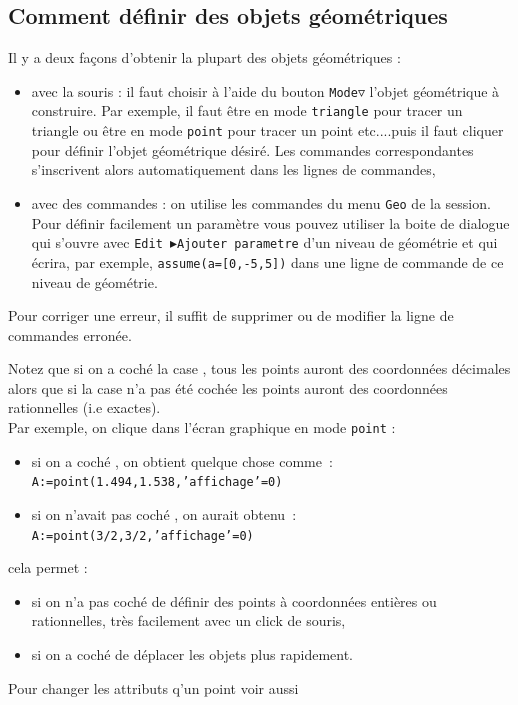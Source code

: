 \documentclass[a4paper,11pt]{article}
\begin{document}
\subsection{Comment d\'efinir des objets g\'eom\'etriques}\label{sec:sim}
Il y a deux fa\c{c}ons d'obtenir la plupart des objets g\'eom\'etriques :
\begin{itemize}
\item avec la souris : il faut choisir \`a l'aide du bouton 
{\tt Mode$\triangledown$} l'objet 
g\'eom\'etrique \`a construire. Par exemple, il faut  \^etre en mode 
{\tt triangle} pour tracer un triangle ou \^etre en mode {\tt point} pour 
tracer un point etc....puis il faut cliquer pour d\'efinir l'objet 
g\'eom\'etrique d\'esir\'e. Les commandes correspondantes s'inscrivent alors
automatiquement dans les lignes de commandes, 
\item avec des commandes : on utilise les commandes du menu {\tt Geo} de la 
session.\\
Pour d\'efinir facilement un param\`etre vous pouvez utiliser la boite de 
dialogue qui s'ouvre avec {\tt Edit $\blacktriangleright$Ajouter parametre}
d'un niveau de g\'eom\'etrie et qui \'ecrira, par exemple, 
{\tt assume(a=[0,-5,5])} dans une ligne de commande de ce niveau de 
g\'eom\'etrie.
\end{itemize}

Pour corriger une erreur, il suffit de supprimer ou de modifier la ligne de 
commandes erron\'ee.

Notez que si on a coch\'e la case \framebox{$\sim$}\index{$\sim$}, tous les 
points auront des coordonn\'ees d\'ecimales alors que si la case 
\framebox{$\sim$} n'a pas \'et\'e coch\'ee les points auront des coordonn\'ees 
rationnelles (i.e exactes).\\
Par exemple, on clique dans l'\'ecran graphique en mode {\tt point} :
\begin{itemize}
\item si on a coch\'e \framebox{$\sim$}, on obtient quelque
chose comme~:\\
{\tt A:=point(1.494,1.538,'affichage'=0)}
\item
si on n'avait pas coch\'e \framebox{$\sim$}, on aurait obtenu~:\\
{\tt A:=point(3/2,3/2,'affichage'=0)}
\end{itemize}
cela permet :
\begin{itemize}
\item si on n'a pas coch\'e \framebox{$\sim$} de d\'efinir des points \`a 
coordonn\'ees enti\`eres ou rationnelles, tr\`es facilement avec un click de 
souris,
\item si on a coch\'e \framebox{$\sim$} de d\'eplacer les objets plus 
rapidement.
\end{itemize}
Pour changer les attributs q'un point voir aussi \pageref{sec:symb}
\end{document}
